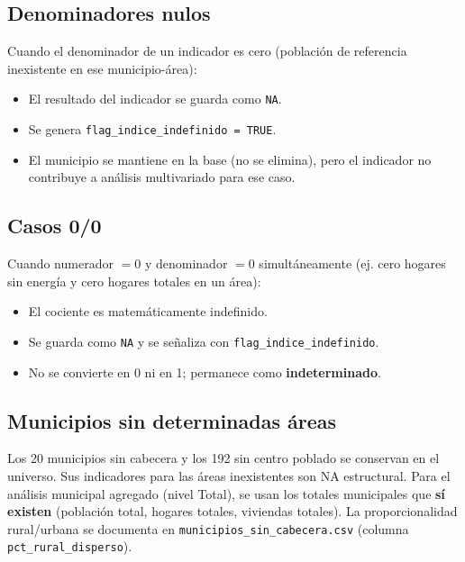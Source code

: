 \subsection{Denominadores nulos}
\label{sec:denominador_cero}

Cuando el denominador de un indicador es cero (población de referencia inexistente en ese municipio-área):

\begin{itemize}
    \item El resultado del indicador se guarda como \texttt{NA}.
    \item Se genera \texttt{flag\_indice\_indefinido = TRUE}.
    \item El municipio se mantiene en la base (no se elimina), pero el indicador no contribuye a análisis multivariado para ese caso.
\end{itemize}

\subsection{Casos 0/0}
\label{sec:caso_0_0}

Cuando numerador $=0$ y denominador $=0$ simultáneamente (ej. cero hogares sin energía y cero hogares totales en un área):

\begin{itemize}
    \item El cociente es matemáticamente indefinido.
    \item Se guarda como \texttt{NA} y se señaliza con \texttt{flag\_indice\_indefinido}.
    \item No se convierte en 0 ni en 1; permanece como \textbf{indeterminado}.
\end{itemize}

\subsection{Municipios sin determinadas áreas}
\label{sec:municipios_sin_areas}

Los 20 municipios sin cabecera y los 192 sin centro poblado se conservan en el universo. Sus indicadores para las áreas inexistentes son NA estructural. Para el análisis municipal agregado (nivel Total), se usan los totales municipales que \textbf{sí existen} (población total, hogares totales, viviendas totales). La proporcionalidad rural/urbana se documenta en \texttt{municipios\_sin\_cabecera.csv} (columna \texttt{pct\_rural\_disperso}).


